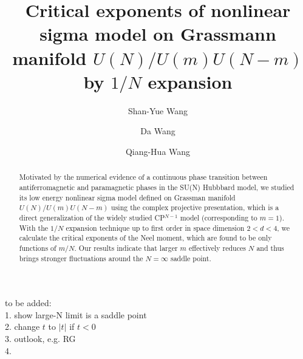 \documentclass[aps,twocolumn,superscriptaddress]{revtex4-1}
\begin{document}
\title{Critical exponents of nonlinear sigma model on Grassmann manifold $U(N)/U(m)U(N-m)$ by $1/N$ expansion}
\author{Shan-Yue Wang}
\author{Da Wang}
\author{Qiang-Hua Wang}
\begin{abstract}
  Motivated by the numerical evidence of a continuous phase transition between antiferromagnetic and paramagnetic phases
  in the SU(N) Hubbbard model, we studied its low energy nonlinear sigma model defined on Grassman manifold
  $U(N)/U(m)U(N-m)$ using the complex projective presentation, which is a direct generalization of the widely studied
  CP$^{N-1}$ model (corresponding to $m=1$). With the $1/N$ expansion technique up to first order in space dimension
  $2<d<4$, we calculate the critical exponents of the Neel moment, which are found to be only functions of $m/N$. Our
  results indicate that larger $m$ effectively reduces $N$ and thus brings stronger fluctuations around the $N=\infty$
  saddle point.
\end{abstract}
\maketitle

to be added: \\
1. show large-N limit is a saddle point \\
2. change $t$ to $|t|$ if $t<0$ \\
3. outlook, e.g. RG \\
4. 
\end{document}
